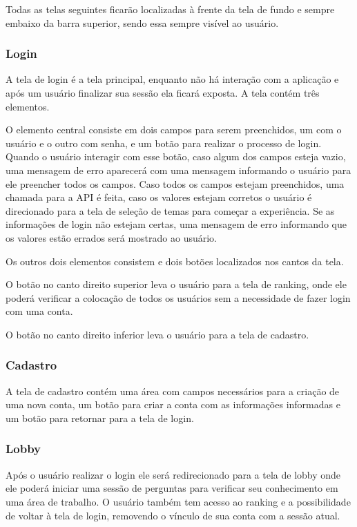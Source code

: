 Todas as telas seguintes ficarão localizadas à frente da tela de fundo e sempre embaixo da barra superior, sendo essa sempre visível ao usuário.

\subsubsection{Login}
\label{subsubsec:login}

A tela de login é a tela principal, enquanto não há interação com a aplicação e após um usuário finalizar sua sessão ela ficará exposta. A tela contém três elementos.
    
O elemento central consiste em dois campos para serem preenchidos, um com o usuário e o outro com senha, e um botão para realizar o processo de login. Quando o usuário interagir com esse botão, caso algum dos campos esteja vazio, uma mensagem de erro aparecerá com uma mensagem informando o usuário para ele preencher todos os campos. Caso todos os campos estejam preenchidos, uma chamada para a API é feita, caso os valores estejam corretos o usuário é direcionado para a tela de seleção de temas para começar a experiência. Se as informações de login não estejam certas, uma mensagem de erro informando que os valores estão errados será mostrado ao usuário.

Os outros dois elementos consistem e dois botões localizados nos cantos da tela.
    
O botão no canto direito superior leva o usuário para a tela de ranking, onde ele poderá verificar a colocação de todos os usuários sem a necessidade de fazer login com uma conta.
    
O botão no canto direito inferior leva o usuário para a tela de cadastro.

\subsubsection{Cadastro}
\label{subsubsec:cadastro}

A tela de cadastro contém uma área com campos necessários para a criação de uma nova conta, um botão para criar a conta com as informações informadas e um botão para retornar para a tela de login.


\subsubsection{Lobby}
\label{subsubsec:lobby}

Após o usuário realizar o login ele será redirecionado para a tela de lobby onde ele poderá iniciar uma sessão de perguntas para verificar seu conhecimento em uma área de trabalho. O usuário também tem acesso ao ranking e a possibilidade de voltar à tela de login, removendo o vínculo de sua conta com a sessão atual.


